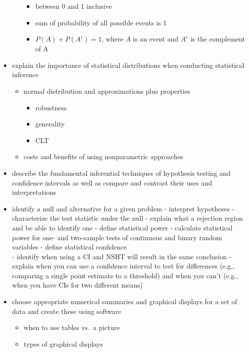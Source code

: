 \documentclass[
]{book}
\providecommand{\tightlist}{%
  \setlength{\itemsep}{0pt}\setlength{\parskip}{0pt}}
\theoremstyle{definition}
\theoremstyle{definition}
\theoremstyle{definition}
\theoremstyle{remark}
\begin{document}
\begin{itemize}
\begin{itemize}
    \begin{itemize}
    \tightlist
    \item
      between 0 and 1 inclusive
    \item
      sum of probability of all possible events is 1
    \item
      \(P(A) + P(A^c) = 1\), where \(A\) is an event and \(A^c\) is the complement of A
    \end{itemize}
  \end{itemize}
\item
  explain the importance of statistical distributions when conducting statistical inference

  \begin{itemize}
  \tightlist
  \item
    normal distribution and approximations plus properties

    \begin{itemize}
    \tightlist
    \item
      robustness
    \item
      generality
    \item
      CLT
    \end{itemize}
  \item
    costs and benefits of using nonparametric approaches
  \end{itemize}
\item
  describe the fundamental inferential techniques of hypothesis testing and confidence intervals as well as compare and contrast their uses and interpretations
\item
  identify a null and alternative for a given problem
  - interpret hypotheses
  - characterize the test statistic under the null
  - explain what a rejection region and be able to identify one
  - define statistical power
  - calculate statistical power for one- and two-sample tests of continuous and binary random variables
  - define statistical confidence\\
  - identify when using a CI and NSHT will result in the same conclusion
  - explain when you can use a confidence interval to test for differences (e.g., comparing a single point estimate to a threshold) and when you can't (e.g., when you have CIs for two different means)
\item
  choose appropriate numerical summaries and graphical displays for a set of data and create these using software

  \begin{itemize}
  \tightlist
  \item
    when to use tables vs.~a picture
  \item
    types of graphical displays


\end{itemize}
\end{itemize}
\end{document}
